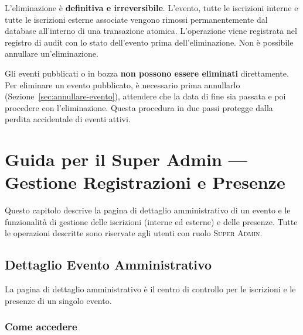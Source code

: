 \documentclass[a4paper,11pt,oneside]{book}
\newcommand{\ruolo}[1]{\textsc{#1}}
\begin{document}
\begin{dangerbox}
L'eliminazione \`e \textbf{definitiva e irreversibile}. L'evento, tutte le iscrizioni interne e tutte le iscrizioni esterne associate vengono rimossi permanentemente dal database all'interno di una transazione atomica. L'operazione viene registrata nel registro di audit con lo stato dell'evento prima dell'eliminazione. Non \`e possibile annullare un'eliminazione.
\end{dangerbox}

\begin{infobox}
Gli eventi pubblicati o in bozza \textbf{non possono essere eliminati} direttamente. Per eliminare un evento pubblicato, \`e necessario prima annullarlo (Sezione~\ref{sec:annullare-evento}), attendere che la data di fine sia passata e poi procedere con l'eliminazione. Questa procedura in due passi protegge dalla perdita accidentale di eventi attivi.
\end{infobox}


\chapter{Guida per il Super Admin --- Gestione Registrazioni e Presenze}
\label{ch:admin-registrazioni}

Questo capitolo descrive la pagina di dettaglio amministrativo di un evento e le funzionalit\`a di gestione delle iscrizioni (interne ed esterne) e delle presenze. Tutte le operazioni descritte sono riservate agli utenti con ruolo \ruolo{Super Admin}.

\section{Dettaglio Evento Amministrativo}
\label{sec:dettaglio-evento-admin}

La pagina di dettaglio amministrativo \`e il centro di controllo per le iscrizioni e le presenze di un singolo evento.

\subsection{Come accedere}
\end{document}
